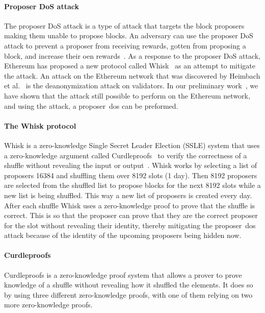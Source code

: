 \paragraph*{\textbf{Proposer DoS attack}}\label{sec:background-proposer-DoS-attacks}
The proposer DoS attack is a type of attack that targets the block proposers making them unable to propose blocks.
An adversary can use the proposer DoS attack to prevent a proposer from receiving rewards, gotten from proposing a block, and increase their oen rewards~\cite{EthereumSSLE2024}.
As a response to the proposer DoS attack, Ethereum has proposed a new protocol called Whisk~\cite{Whisk2024} as an attempt to mitigate the attack.
An attack on the Ethereum network that was discovered by Heimbach et al.~\cite{heimbach2024deanonymizingethereumvalidatorsp2p} is the deanonymization attack on validators.
In our preliminary work~\cite{ouroldpaper}, we have shown that the attack still possible to perform on the Ethereum network, and using the attack, a proposer~\gls{dos} can be preformed.


\paragraph*{\textbf{The Whisk protocol}}\label{sec:background-mitigation}
Whisk is a zero-knowledge Single Secret Leader Election (SSLE) system that uses a zero-knowledge argument called Curdleproofs~\cite{Curdleproofs} to verify the correctness of a shuffle without revealing the input or output~\cite{10.1145/3419614.3423258}.
Whisk works by selecting a list of proposers 16384 and shuffling them over 8192 slots (1 day).
Then 8192 proposers are selected from the shuffled list to propose blocks for the next 8192 slots while a new list is being shuffled.
This way a new list of proposers is created every day.
After each shuffle Whisk uses a zero-knowledge proof to prove that the shuffle is correct.
This is so that the proposer can prove that they are the correct proposer for the slot without revealing their identity, thereby mitigating the proposer~\gls{dos} attack because of the identity of the upcoming proposers being hidden now.

\paragraph*{\textbf{Curdleproofs}}\label{sec:background-curdleproofs}
Curdleproofs is a zero-knowledge proof system that allows a prover to prove knowledge of a shuffle without revealing how it shuffled the elements.
It does so by using three different zero-knowledge proofs, with one of them relying on two more zero-knowledge proofs.

